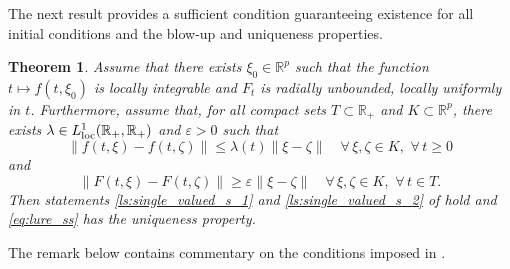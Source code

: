 \documentclass[a4paper,11pt]{article}
\newcommand{\R}{\mathbb R}
\numberwithin{equation}{section}
\numberwithin{figure}{section}
\numberwithin{table}{section}
\newtheorem{theorem}{Theorem}[section]
\begin{document}
The next result provides a sufficient condition guaranteeing existence for all initial conditions
and the blow-up and uniqueness properties.
%
\begin{theorem}\label{thm:single_valued_uniqueness}
Assume that there exists $\xi_0\in\R^p$ such that the function
$t\mapsto f(t,\xi_0)$ is locally integrable and $F_t$ is radially unbounded, locally
uniformly in $t$. Furthermore, assume that, for all compact sets $T\subset\R_+$ and
$K\subset\R^p$, there exists $\lambda\in L^1_{\rm loc}(\R_+,\R_+)$ and $\varepsilon>0$ such that
\begin{equation}\label{eq:lipschitz}
\|f(t,\xi)-f(t,\zeta)\|\leq\lambda(t)\|\xi-\zeta\|\quad\forall\,\xi,\zeta\in K,\,\,\forall\,t\geq 0
\end{equation}
and
\begin{equation}\label{eq:lower_lipschitz}
\|F(t,\xi)-F(t,\zeta)\|\geq\varepsilon\|\xi-\zeta\|\quad\forall\,\xi,\zeta\in K,\,\,\forall\,t\in T.
\end{equation}
Then statements \ref{ls:single_valued_s_1} and \ref{ls:single_valued_s_2} of  hold
and \eqref{eq:lure_ss} has the uniqueness property.
\end{theorem}
%
The remark below contains commentary on the conditions imposed in .
%
\end{document}

